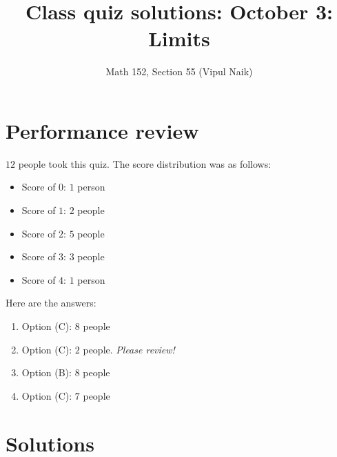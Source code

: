 \documentclass[10pt]{amsart}
\title{Class quiz solutions: October 3: Limits}
\author{Math 152, Section 55 (Vipul Naik)}
\begin{document}
\maketitle

\section{Performance review}

$12$ people took this quiz. The score distribution was as follows:

\begin{itemize}
\item Score of $0$: $1$ person
\item Score of $1$: $2$ people
\item Score of $2$: $5$ people
\item Score of $3$: $3$ people
\item Score of $4$: $1$ person
\end{itemize}

Here are the answers:

\begin{enumerate}
\item Option (C): $8$ people
\item Option (C): $2$ people. {\em Please review!}
\item Option (B): $8$ people
\item Option (C): $7$ people
\end{enumerate}

\section{Solutions}
\end{document}
